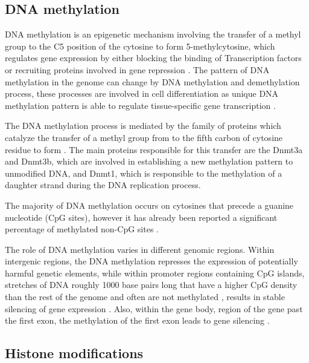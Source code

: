 \subsection{DNA methylation}
DNA methylation is an epigenetic mechanism involving the transfer of a methyl group to the C5
position of the cytosine to form 5-methylcytosine, which regulates
gene expression  by either blocking the binding of Transcription factors or
recruiting proteins involved in gene repression \cite{moore2013dna}.
The pattern of DNA methylation in the genome can change by DNA methylation and demethylation process,
these processes are involved in cell differentiation as unique DNA methylation pattern is able to regulate
tissue-specific gene transcription \cite{moore2013dna}.

The DNA methylation process is mediated by the family of 
proteins which catalyze the transfer of a methyl group from  to the fifth carbon of cytosine residue to form .
The main proteins responsible for this transfer are the Dnmt3a and Dnmt3b, which
are involved in establishing a new methylation pattern to unmodified DNA, and Dnmt1, which is responsible
to the methylation of a daughter strand during the DNA replication process.

The majority of DNA methylation occurs on cytosines that precede a guanine nucleotide (CpG sites), however
 it has already been reported a significant percentage of methylated non-CpG sites \cite{xie2012base}.

The role of DNA methylation varies in different genomic regions.
Within intergenic regions, the DNA methylation represses the expression of potentially harmful genetic elements,
while within promoter regions containing CpG islands, stretches of DNA roughly 1000 base pairs long that have a higher CpG density than the rest of the genome and  often  are not methylated  \cite{bird1985fraction}, results in stable silencing of gene expression \cite{mohn2008lineage}.
Also, within the gene body, region of the gene past the first exon, the methylation of the first exon leads to gene silencing
\cite{brenet2011dna}.


\subsection{Histone modifications}

